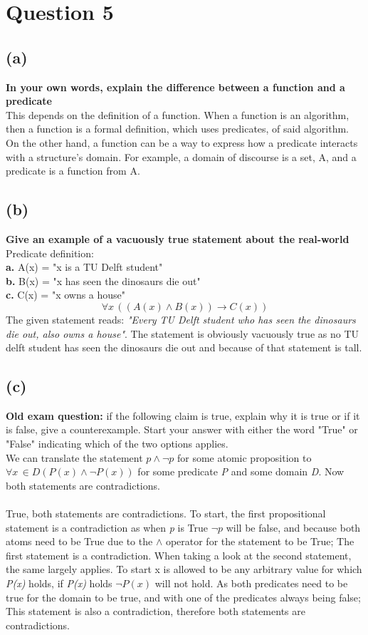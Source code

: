 \documentclass[a4paper]{article}
\begin{document}
\newpage
\section{Question 5}
\subsection{(a)}
\textbf{In your own words, explain the difference between a function and a predicate}\\
This depends on the definition of a function.
When a function is an algorithm, then a function is a formal definition, which uses predicates, of said algorithm.
On the other hand, a function can be a way to express how a predicate interacts with a structure's domain. For example, a domain of discourse is a set, A, and a predicate is a function from A.
\subsection{(b)}
\textbf{Give an example of a vacuously true statement about the real-world}\\
Predicate definition:\\
\textbf{a.} A(x) = "x is a TU Delft student" \\
\textbf{b.} B(x) = "x has seen the dinosaurs die out" \\
\textbf{c.} C(x) = "x owns a house" \\
$$ \forall x \, ((A(x) \land B(x)) \to C(x))$$
The given statement reads: \textit{"Every TU Delft student who has seen the dinosaurs die out, also owns a house"}.
The statement is obviously vacuously true as no TU delft student has seen the dinosaurs die out and because of that statement is tall.
\subsection{(c)}
\textbf{Old exam question:} if the following claim is true, explain why it is true or if it is false, give a counterexample.
Start your answer with either the word "True" or "False" indicating which of the two options applies.\\
We can translate the statement $p \land \neg p$ for some atomic proposition to $\forall x \, \in D(P(x) \land \neg P(x))$ for some predicate \textit{P} and some domain \textit{D}.
Now both statements are contradictions.
\\ \\
True, both statements are contradictions.
To start, the first propositional statement is a contradiction as when \textit{p} is True $ \neg p$ will be false, and because both atoms need to be True due to the $\land$ operator for the statement to be True;
The first statement is a contradiction.
When taking a look at the second statement, the same largely applies.
To start x is allowed to be any arbitrary value for which \textit{P(x)} holds, if \textit{P(x)} holds $\neg P(x)$ will not hold.
As both predicates need to be true for the domain to be true, and with one of the predicates always being false;
This statement is also a contradiction, therefore both statements are contradictions.
\end{document}

